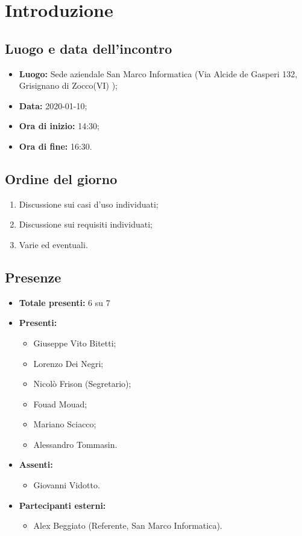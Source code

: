 \section*{Introduzione}

\subsection*{Luogo e data dell'incontro}
	\begin{itemize}
		\item \textbf{Luogo:} Sede aziendale San Marco Informatica (Via Alcide de Gasperi 132, Grisignano di Zocco(VI) );
		\item \textbf{Data:} 2020-01-10;
		\item \textbf{Ora di inizio:} 14:30;
		\item \textbf{Ora di fine:} 16:30.
	\end{itemize}

\subsection*{Ordine del giorno}
	\begin{enumerate}
		\item Discussione sui casi d'uso individuati;
		\item Discussione sui requisiti individuati;
		\item Varie ed eventuali.
	\end{enumerate}

\subsection*{Presenze}
	\begin{itemize}
		\item \textbf{Totale presenti:} 6 su 7
		\item \textbf{Presenti: }
			\begin{itemize}			
				\item Giuseppe Vito Bitetti;
				\item Lorenzo Dei Negri;
				\item Nicolò Frison (Segretario);
				\item Fouad Mouad;
				\item Mariano Sciacco;
				\item Alessandro Tommasin.
			\end{itemize}
		\item \textbf{Assenti: } 
			\begin{itemize}	
				\item Giovanni Vidotto.
			\end{itemize}
		\item \textbf{Partecipanti esterni:}
			\begin{itemize}
				\item Alex Beggiato (Referente, San Marco Informatica).
			\end{itemize}
	\end{itemize}


